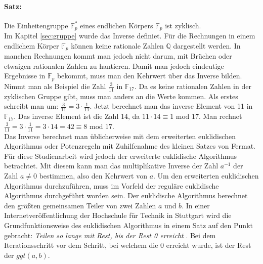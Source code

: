 \paragraph{Satz:}
Die Einheitengruppe $\mathbb{F}_p^*$ eines endlichen Körpers $\mathbb{F}_p$ ist zyklisch.\\

Im Kapitel \ref{sec:gruppe} wurde das Inverse definiet. Für die Rechnungen in einem endlichem Körper $\mathbb{F}_p$ können keine rationale Zahlen $\mathbb{Q}$ dargestellt werden. In manchen Rechnungen kommt man jedoch nicht darum, mit Brüchen oder etwaigen rationalen Zahlen zu hantieren. Damit man jedoch eindeutige Ergebnisse in $\mathbb{F}_p$ bekommt, muss man den Kehrwert über das Inverse bilden. Nimmt man als Beispiel die Zahl $\frac{3}{11}$ in $\mathbb{F}_{17}$. Da es keine rationalen Zahlen in der zyklischen Gruppe gibt, muss man anders an die Werte kommen. Als erstes schreibt man um: $\frac{3}{11} = 3 \cdot \frac{1}{11}$. Jetzt berechnet man das inverse Element von 11 in $\mathbb{F}_{17}$. Das inverse Element ist die Zahl 14, da $11 \cdot 14 \equiv 1 \text{ mod } 17$. Man rechnet $\frac{3}{11} = 3 \cdot \frac{1}{11} = 3 \cdot 14 = 42 \equiv 8 \text{ mod } 17$.\\ 

Das Inverse berechnet man üblicherweise mit dem erweiterten euklidischen Algorithmus oder Potenzregeln mit Zuhilfenahme des kleinen Satzes von Fermat. Für diese Studienarbeit wird jedoch der erweiterte euklidische Algorithmus betrachtet. Mit diesem kann man das multiplikative Inverse der Zahl $a^{-1}$ der Zahl $a \neq 0$ bestimmen, also den Kehrwert von $a$. Um den erweiterten euklidischen Algorithmus durchzuführen, muss im Vorfeld der reguläre euklidische Algorithmus durchgeführt worden sein. Der euklidische Algorithmus berechnet den größten gemeinsamen Teiler von zwei Zahlen $a$ und $b$. In einer Internetveröffentlichung der Hochschule für Technik in Stuttgart wird die Grundfunktionsweise des euklidischen Algorithmus in einem Satz auf den Punkt gebracht: \textit{Teilen so lange mit Rest, bis der Rest 0 erreicht} \cite[S. 2]{HFT.Stuttgart}. Bei dem Iterationsschritt vor dem Schritt, bei welchem die 0 erreicht wurde, ist der Rest der $ggt(a, b)$.\\

